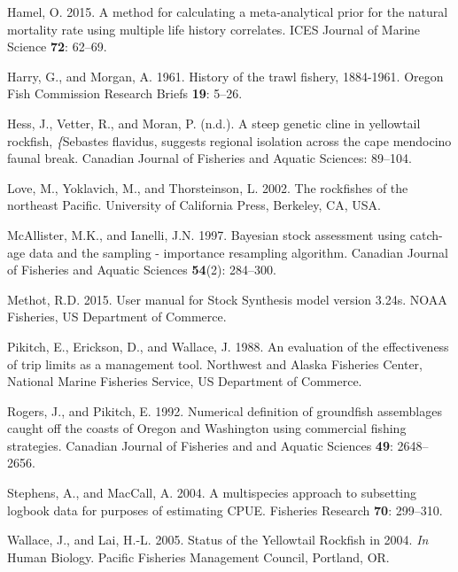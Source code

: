 \documentclass[12pt,]{article}
\begin{document}
\hypertarget{ref-Hamel2015}{}
Hamel, O. 2015. A method for calculating a meta-analytical prior for the
natural mortality rate using multiple life history correlates. ICES
Journal of Marine Science \textbf{72}: 62--69.

\hypertarget{ref-Harry1961}{}
Harry, G., and Morgan, A. 1961. History of the trawl fishery, 1884-1961.
Oregon Fish Commission Research Briefs \textbf{19}: 5--26.

\hypertarget{ref-Hess2011}{}
Hess, J., Vetter, R., and Moran, P. (n.d.). A steep genetic cline in
yellowtail rockfish, \emph{\{}Sebastes flavidus, suggests regional
isolation across the cape mendocino faunal break. Canadian Journal of
Fisheries and Aquatic Sciences: 89--104.

\hypertarget{ref-Love2002}{}
Love, M., Yoklavich, M., and Thorsteinson, L. 2002. The rockfishes of
the northeast Pacific. University of California Press, Berkeley, CA,
USA.

\hypertarget{ref-McAllister1997}{}
McAllister, M.K., and Ianelli, J.N. 1997. Bayesian stock assessment
using catch-age data and the sampling - importance resampling algorithm.
Canadian Journal of Fisheries and Aquatic Sciences \textbf{54}(2):
284--300.

\hypertarget{ref-Methot2015}{}
Methot, R.D. 2015. User manual for Stock Synthesis model version 3.24s.
NOAA Fisheries, US Department of Commerce.

\hypertarget{ref-Pikitch1988}{}
Pikitch, E., Erickson, D., and Wallace, J. 1988. An evaluation of the
effectiveness of trip limits as a management tool. Northwest and Alaska
Fisheries Center, National Marine Fisheries Service, US Department of
Commerce.

\hypertarget{ref-Rogers1992}{}
Rogers, J., and Pikitch, E. 1992. Numerical definition of groundfish
assemblages caught off the coasts of Oregon and Washington using
commercial fishing strategies. Canadian Journal of Fisheries and and
Aquatic Sciences \textbf{49}: 2648--2656.

\hypertarget{ref-Stephens2004}{}
Stephens, A., and MacCall, A. 2004. A multispecies approach to
subsetting logbook data for purposes of estimating CPUE. Fisheries
Research \textbf{70}: 299--310.

\hypertarget{ref-Wallace2005}{}
Wallace, J., and Lai, H.-L. 2005. Status of the Yellowtail Rockfish in
2004. \emph{In} Human Biology. Pacific Fisheries Management Council,
Portland, OR.
\end{document}
